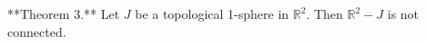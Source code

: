**Theorem 3.** Let $J$ be a topological 1-sphere in $\mathbb{R}^2$. Then $\mathbb{R}^2 - J$ is not connected.
